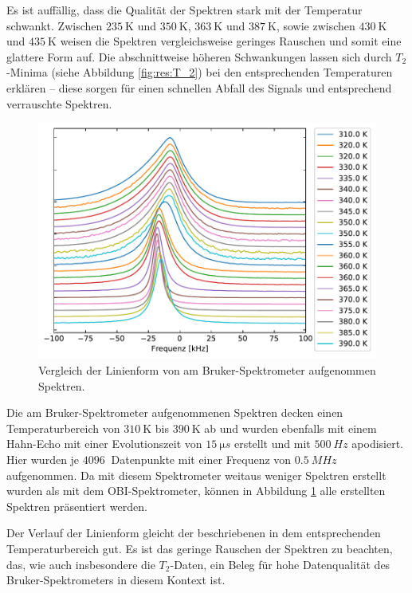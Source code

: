 Es ist auffällig, dass die Qualität der Spektren stark mit der Temperatur schwankt. Zwischen $\SI{235}{\kelvin}$ und $\SI{350}{\kelvin}$, $\SI{363}{\kelvin}$ und $\SI{387}{\kelvin}$, sowie zwischen $\SI{430}{\kelvin}$ und $\SI{435}{\kelvin}$ weisen die Spektren vergleichsweise geringes Rauschen und somit eine glattere Form auf. Die abschnittweise höheren Schwankungen lassen sich durch $T_2$-Minima (siehe Abbildung \ref{fig:res:T_2}) bei den entsprechenden Temperaturen erklären -- diese sorgen für einen schnellen Abfall des Signals und entsprechend verrauschte Spektren.

\begin{figure}
	\begin{center}
		\includegraphics[width=\textwidth]{graphics/plot/bruker_lineshape.pdf}
	\end{center}
	\caption{Vergleich der Linienform von am Bruker-Spektrometer aufgenommen Spektren.} \label{fig:res:bruker_linienform}
\end{figure}
Die am Bruker-Spektrometer aufgenommenen Spektren decken einen Temperaturbereich von $\SI{310}{\kelvin}$ bis $\SI{390}{\kelvin}$ ab und wurden ebenfalls mit einem Hahn-Echo mit einer Evolutionszeit von $\SI{15}{\micro s}$ erstellt und mit $\SI{500}{Hz}$ apodisiert. Hier wurden je $\SI{4096}{}$ Datenpunkte mit einer Frequenz von $\SI{0.5}{MHz}$ aufgenommen. Da mit diesem Spektrometer weitaus weniger Spektren erstellt wurden als mit dem OBI-Spektrometer, können in Abbildung \ref{fig:res:bruker_linienform} alle erstellten Spektren präsentiert werden.

Der Verlauf der Linienform gleicht der beschriebenen in dem entsprechenden Temperaturbereich gut. Es ist das geringe Rauschen der Spektren zu beachten, das, wie auch insbesondere die $T_2$-Daten, ein Beleg für hohe Datenqualität des Bruker-Spektrometers in diesem Kontext ist.

